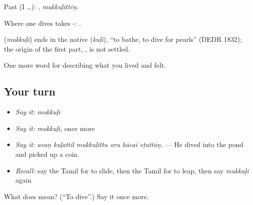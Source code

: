 Past (I …): , \emph{mukkuḷittēṉ}.

Where one dives takes -:  .

\begin{cousinweb}
\textbf{} (\emph{mukkuḷi}) ends in the native  (\emph{kuḷi}), \textquotedblleft{}to bathe, to dive for pearls\textquotedblright{} (DEDR 1832); the origin of the first part, , is not settled.
\end{cousinweb}

\begin{grammarlens}[title={What you've built}]
One more word for describing what you lived and felt.
\end{grammarlens}

\subsection*{Your turn}
\begin{itemize}
\raggedright
  \item \emph{Say it:} \emph{mukkuḷi}
  \item \emph{Say it:} \emph{mukkuḷi}, once more
  \item \emph{Say it:} \emph{avaṉ kuḷattil mukkuḷittu oru kācai eṭuttāṉ.} — He dived into the pond and picked up a coin.
  \item \emph{Recall:} say the Tamil for to slide, then the Tamil for to leap, then say \emph{mukkuḷi} again
\end{itemize}

\begin{tcolorbox}[breakable,colback=teal!4,colframe=teal!35!black,title={Before you move on}]
What does  mean? (\textquotedblleft{}To dive\textquotedblright{}.) Say it once more.
\end{tcolorbox}
